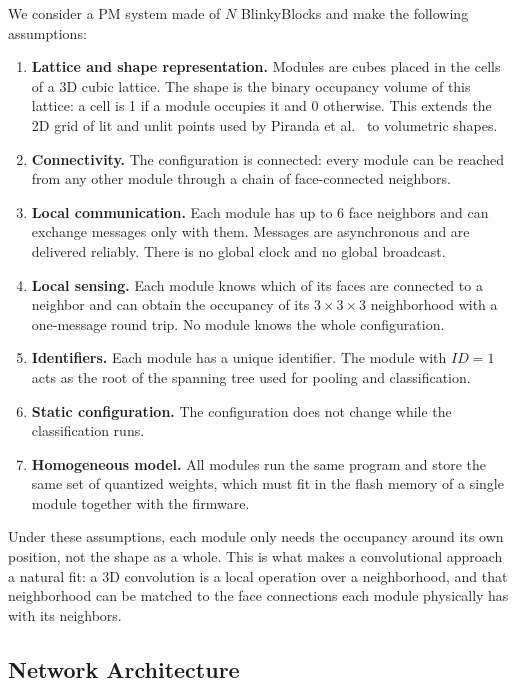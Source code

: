 \documentclass[12pt]{article}
\begin{document}
We consider a PM system made of $N$ BlinkyBlocks and make the following assumptions:
\begin{enumerate}
  \item \textbf{Lattice and shape representation.} Modules are cubes placed in the cells of a 3D cubic lattice. The shape is the binary occupancy volume of this lattice: a cell is 1 if a module occupies it and 0 otherwise. This extends the 2D grid of lit and unlit points used by Piranda et al.~\cite{piranda2024ai4pm} to volumetric shapes.
  \item \textbf{Connectivity.} The configuration is connected: every module can be reached from any other module through a chain of face-connected neighbors.
  \item \textbf{Local communication.} Each module has up to 6 face neighbors and can exchange messages only with them. Messages are asynchronous and are delivered reliably. There is no global clock and no global broadcast.
  \item \textbf{Local sensing.} Each module knows which of its faces are connected to a neighbor and can obtain the occupancy of its $3\times3\times3$ neighborhood with a one-message round trip. No module knows the whole configuration.
  \item \textbf{Identifiers.} Each module has a unique identifier. The module with $ID=1$ acts as the root of the spanning tree used for pooling and classification.
  \item \textbf{Static configuration.} The configuration does not change while the classification runs.
  \item \textbf{Homogeneous model.} All modules run the same program and store the same set of quantized weights, which must fit in the flash memory of a single module together with the firmware.
\end{enumerate}

Under these assumptions, each module only needs the occupancy around its own position, not the shape as a whole. This is what makes a convolutional approach a natural fit: a 3D convolution is a local operation over a neighborhood, and that neighborhood can be matched to the face connections each module physically has with its neighbors.

\subsection{Network Architecture}
\end{document}
